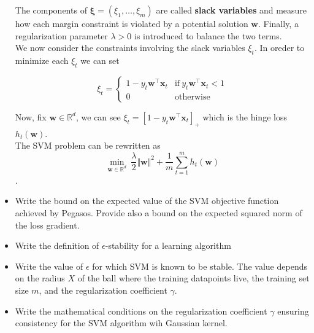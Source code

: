 \begin{itemize}
        The components of $\boldsymbol{\xi} = (\xi_1, \dots, \xi_m)$ are called \textbf{slack variables} and measure how each margin constraint is violated by a potential solution $\boldsymbol{w}$. Finally, a regularization parameter $\lambda > 0$ is introduced to balance the two terms.\\

        We now consider the constraints involving the slack variables $\xi_t$. In oreder to minimize each $\xi_t$ we can set
        
        \begin{equation}
            \xi_t =
            \begin{cases}
                1 - y_t \boldsymbol{w}^\top \boldsymbol{x}_t & \text{if} \ y_t \boldsymbol{w}^\top \boldsymbol{x}_t < 1 \\                
                0 & \text{otherwise}
            \end{cases}
        \end{equation}
        
        Now, fix $\boldsymbol{w} \in \mathbb{R}^d$, we can see $\xi_t = \left[1 - y_t \boldsymbol{w}^\top \boldsymbol{x}_t \right]_+$ which is the hinge loss  $h_{t}(\boldsymbol{w})$.\\

        The SVM problem can be rewritten as $$\underset{\boldsymbol{w} \in \mathbb{R}^d}{\min} \ \frac{\lambda}{2} \Vert \boldsymbol{w} \Vert^2 + \frac{1}{m} \sum_{t = 1}^m h_{t}(\boldsymbol{w})$$.\\



    \item Write the bound on the expected value of the SVM objective function achieved by Pegasos.
Provide also a bound on the expected squared norm of the loss gradient.\\

    \item Write the definition of $\epsilon$-stability for a learning algorithm\\

    \item Write the value of $\epsilon$ for which SVM is known to be stable. The value depends on the radius $X$ of the ball where the training datapoints live, the training set size $m$, and the regularization coefficient $\gamma$.\\

    \item Write the mathematical conditions on the regularization coefficient $\gamma$ ensuring consistency for the SVM algorithm wih Gaussian kernel.\\

\end{itemize}
